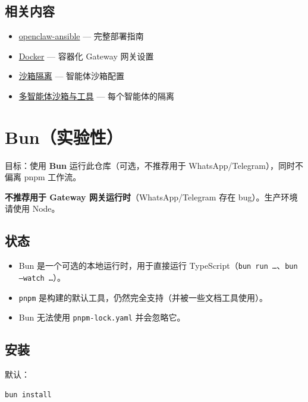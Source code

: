 \subsection{相关内容}


\begin{itemize}
  \item \href{https://github.com/openclaw/openclaw-ansible}{openclaw-ansible} — 完整部署指南
  \item \href{/install/docker}{Docker} — 容器化 Gateway 网关设置
  \item \href{/gateway/sandboxing}{沙箱隔离} — 智能体沙箱配置
  \item \href{/tools/multi-agent-sandbox-tools}{多智能体沙箱与工具} — 每个智能体的隔离
\end{itemize}



\clearpage

\section{Bun（实验性）}


目标：使用 \textbf{Bun} 运行此仓库（可选，不推荐用于 WhatsApp/Telegram），同时不偏离 pnpm 工作流。

 \textbf{不推荐用于 Gateway 网关运行时}（WhatsApp/Telegram 存在 bug）。生产环境请使用 Node。

\subsection{状态}


\begin{itemize}
  \item Bun 是一个可选的本地运行时，用于直接运行 TypeScript（\texttt{bun run …}、\texttt{bun --watch …}）。
  \item \texttt{pnpm} 是构建的默认工具，仍然完全支持（并被一些文档工具使用）。
  \item Bun 无法使用 \texttt{pnpm-lock.yaml} 并会忽略它。
\end{itemize}


\subsection{安装}


默认：

\begin{lstlisting}[language=bash]
bun install
\end{lstlisting}


